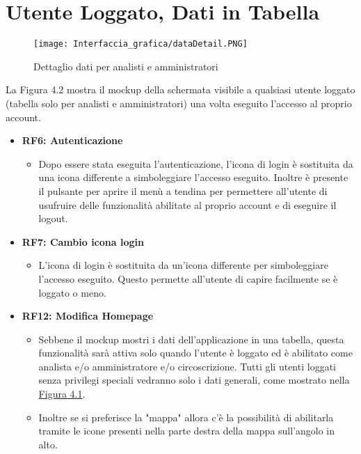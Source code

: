 \newpage
\section{Utente Loggato, Dati in Tabella}

    \begin{figure}[H]
        \center
        \texttt{[image: Interfaccia\_grafica/dataDetail.PNG]}
        \caption{Dettaglio dati per analisti e amministratori}
    \end{figure}    

    La Figura 4.2 mostra il mockup della schermata visibile a qualsiasi utente loggato (tabella solo per analisti e amministratori) una volta eseguito l'accesso al proprio account.

    \begin{itemize}
        \item \textbf{RF6: Autenticazione} \begin{itemize} 
            \item Dopo essere stata eseguita l'autenticazione, l'icona di login è sostituita da una icona differente a simboleggiare l'accesso eseguito. Inoltre è presente il pulsante per aprire il menù a tendina per permettere all'utente di usufruire delle funzionalità abilitate al proprio account e di eseguire il logout.
        \end{itemize}
        \item \textbf{RF7: Cambio icona login} \begin{itemize} 
            \item L'icona di login è sostituita da un'icona differente per simboleggiare l'accesso eseguito. Questo permette all'utente di capire facilmente se è loggato o meno.
        \end{itemize}
        \item \textbf{RF12: Modifica Homepage} \begin{itemize}
            \item Sebbene il mockup mostri i dati dell'applicazione in una tabella, questa funzionalità sarà attiva solo quando l'utente è loggato ed è abilitato come analista e/o amministratore e/o circoscrizione. Tutti gli utenti loggati senza privilegi speciali vedranno solo i dati generali, come mostrato nella \hyperref[fig:4.1]{Figura 4.1}.
            \item Inoltre se si preferisce la "mappa" allora c'è la possibilità di abilitarla tramite le icone presenti nella parte destra della mappa sull'angolo in alto. 
        \end{itemize}

\end{itemize}
